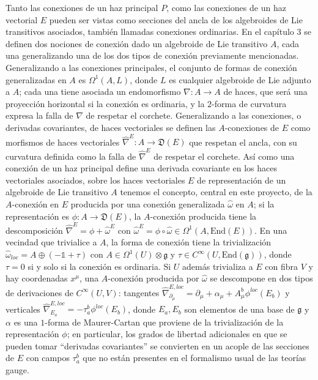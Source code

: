 Tanto las conexiones de un haz principal $P$, como las conexiones de un haz vectorial $E$ pueden ser vistas como secciones del ancla de los algebroides de Lie transitivos asociados, también llamadas conexiones ordinarias. En el capítulo $3$ se definen dos nociones de conexión dado un algebroide de Lie transitivo $A$, cada una generalizando una de los dos tipos de conexión previamente mencionadas. Generalizando a las conexiones principales, el conjunto de formas de conexión generalizadas en $A$ es $\Omega^1(A, L)$, donde $L$ es cualquier algebroide de Lie adjunto a $A$; cada una tiene asociada un endomorfismo $\nabla: A \to A$ de haces, que será una proyección horizontal si la conexión es ordinaria, y la $2$-forma de curvatura expresa la falla de $\nabla$ de respetar el corchete. Generalizando a las conexiones, o derivadas covariantes, de haces vectoriales se definen las $A$-conexiones de $E$ como morfismos de haces vectoriales $\hat \nabla^E: A \to \mathfrak D(E)$ que respetan el ancla, con su curvatura definida como la falla de $\hat \nabla^E$ de respetar el corchete. Así como una conexión de un haz principal define una derivada covariante en los haces vectoriales asociados, sobre los haces vectoriales $E$ de representación de un algebroide de Lie transitivo $A$ tenemos el concepto, central en este proyecto, de la $A$-conexión en $E$ producida por una conexión generalizada $\hat \omega$ en $A$; si la representación es $\phi: A \to \mathfrak D(E)$, la $A$-conexión producida tiene la descomposición $\hat \nabla^E = \phi + \hat \omega^E$ con $\hat \omega^E = \phi \circ \hat \omega \in \Omega^1(A, \text{End}(E))$. En una vecindad que trivialice a $A$, la forma de conexión tiene la trivialización $\hat \omega_{loc} = A \oplus (-\mathbb 1 + \tau)$ con $A \in \Omega^1(U)\otimes \mathfrak g$ y $\tau \in C^\infty(U, \text{End}(\mathfrak g))$, donde $\tau = 0$ si y solo si la conexión es ordinaria. Si $U$ además trivializa a $E$ con fibra $V$ y hay coordenadas ${x^\mu}$, una $A$-conexión producida por $\hat \omega$ se descompone en dos tipos de derivaciones de $C^\infty(U, V)$: tangentes $\hat \nabla^{E, loc}_{\partial_\mu} = \partial_\mu + \alpha_\mu + A^b_\mu \phi^{loc}(E_b)$ y verticales $\hat \nabla^{E, loc}_{E_a} = - \tau^b_a \phi^{loc} (E_b)$, donde $E_a, E_b$ son elementos de una base de $\mathfrak g$ y $\alpha$ es una $1$-forma de Maurer-Cartan que proviene de la trivialización de la representación $\phi$; en particular, los grados de libertad adicionales en que se pueden tomar ``derivadas covariantes'' se convierten en un acople de las secciones de $E$ con campos $\tau^b_a$ que no están presentes en el formalismo usual de las teorías gauge.

